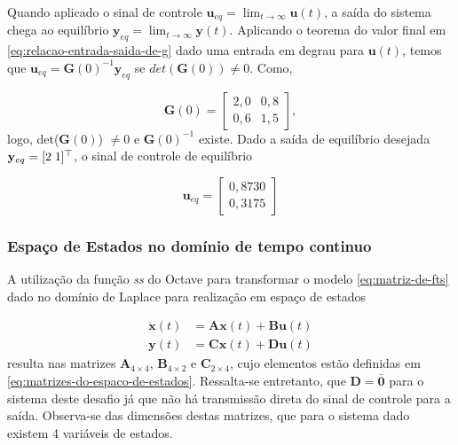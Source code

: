Quando aplicado o sinal de controle $\mathbf{u}_{eq} = \lim_{t \rightarrow
        \infty }\mathbf{u}(t)$, a saída do sistema chega ao equilíbrio $\mathbf{y}_{eq}
    = \lim_{t \rightarrow \infty }\mathbf{y}(t)$. Aplicando o teorema do valor
final em \ref{eq:relacao-entrada-saida-de-g} dado uma entrada em degrau para
$\mathbf{u}(t)$, temos que $\mathbf{u}_{eq} = \mathbf{G}(0)^{-1}\mathbf{y}_{eq}$
se $det(\mathbf{G}(0)) \neq 0$. Como,

\begin{equation}
    \label{eq:ganho-estatico-de-g}
    \mathbf{G}(0)
    =
    \begin{bmatrix}
        2,0 & 0,8 \\
        0,6 & 1,5
    \end{bmatrix},
\end{equation}logo, det($\mathbf{G}(0)$) $\neq 0$ e $\mathbf{G}(0)^{-1}$ existe.
Dado a saída de equilíbrio desejada $\mathbf{y}_{eq} = [2 \thickspace 1]^\top$,
o sinal de controle de equilíbrio

\begin{equation}
    \label{eq:vetor-do-controle-de-equilibrio}
    \mathbf{u}_{eq} =
    \begin{bmatrix}
        0,8730 \\
        0,3175
    \end{bmatrix}
\end{equation}

\subsubsection{Espaço de Estados no domínio de tempo continuo}
\label{subsub:espaco-de-estados-no-dominio-de-tempo-continuo}

A utilização da função \textit{ss} do Octave para transformar o modelo
\ref{eq:matriz-de-fts} dado no domínio de Laplace para realização em espaço de
estados

\begin{subequations}
    \label{eq:espaco-de-estados-continuo}
    \begin{align}
        \mathbf{\dot{x}}(t) & = \mathbf{A}\mathbf{x}(t) + \mathbf{B}\mathbf{u}(t)
        \label{eq:derivada-do-vetor-de-estados}                                   \\
        \mathbf{y}(t)       & = \mathbf{C}\mathbf{x}(t) + \mathbf{D}\mathbf{u}(t)
        \label{eq:saida-do-sistema-em-espaco-de-estados}
    \end{align}
\end{subequations} resulta nas matrizes $\mathbf{A}_{4\times 4}$,
$\mathbf{B}_{4\times 2}$ e $\mathbf{C}_{2\times 4}$, cujo elementos estão
definidas em \ref{eq:matrizes-do-espaco-de-estados}. Ressalta-se entretanto, que
$\mathbf{D} = \mathbf{\bar{0}}$ para o sistema deste desafio já que não há
transmissão direta do sinal de controle para a saída. Observa-se das dimensões
destas matrizes, que para o sistema dado existem 4 variáveis de estados.


